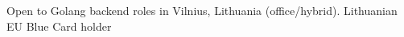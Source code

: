 \documentclass[letter,10pt]{article}
\begin{document}
Open to Golang backend roles in Vilnius, Lithuania (office/hybrid). Lithuanian EU Blue Card holder\\
\end{document}
